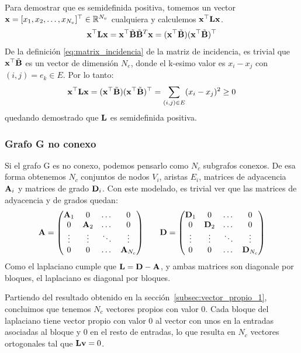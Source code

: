 \documentclass{article}
\begin{document}
Para demostrar que es semidefinida positiva, tomemos un vector $\mathbf{x} = [x_1, x_2, \dots, x_{N_v}]^\top \in \mathbb{R}^{N_v}$
cualquiera y calculemos $\mathbf{x}^\top\mathbf{L}\mathbf{x}$.
\begin{equation*}
    \mathbf{x}^\top\mathbf{L}\mathbf{x} = \mathbf{x}^\top \tilde{\mathbf{B}}\tilde{\mathbf{B}}^T\mathbf{x} = (\mathbf{x}^\top\tilde{\mathbf{B}})(\mathbf{x}^\top\tilde{\mathbf{B}})^\top
\end{equation*}
De la definición \eqref{eq:matrix_incidencia} de la matriz de incidencia, es trivial que $\mathbf{x}^\top \tilde{\mathbf{B}}$ es un vector de dimensión $N_e$, donde el k-esimo valor es $x_i-x_j$ con $(i,j) = e_k \in E$.  Por lo tanto:
\begin{equation}
    \mathbf{x}^\top\mathbf{L}\mathbf{x} = (\mathbf{x}^\top\tilde{\mathbf{B}})(\mathbf{x}^\top\tilde{\mathbf{B}})^\top = \sum_{(i,j)\in E} (x_i-x_j)^2 \geq 0
\end{equation}
quedando demostrado que $\mathbf{L}$ es semidefinida positiva.

\subsubsection{Grafo G no conexo}

Si el grafo G es no conexo, podemos pensarlo como $N_c$ subgrafos conexos. De esa forma
obtenemos $N_c$ conjuntos de nodos $V_i$, aristas $E_i$, matrices de adyacencia $\mathbf{A}_i$ y matrices de grado $\mathbf{D}_i$. Con este modelado, es trivial ver que las matrices de adyacencia y de grados quedan:
\begin{equation*}
    \begin{array}{l c r}
        \mathbf{A} = \left(\begin{matrix}
                             \mathbf{A}_1 & 0      & \dots  & 0          \\
                             0      & \mathbf{A}_2 & \dots  & 0          \\
                             \vdots & \vdots & \ddots & \vdots     \\
                             0      & 0      & \dots  & \mathbf{A}_{N_c}
                         \end{matrix}\right)
         &  &
        \mathbf{D} =\left(\begin{matrix}
                             \mathbf{D}_1 & 0       & \dots  & 0           \\
                             0       & \mathbf{D}_2 & \dots  & 0           \\
                             \vdots  & \vdots  & \ddots & \vdots      \\
                             0       & 0       & \dots  & \mathbf{D}_{N_c}
                         \end{matrix}\right)
    \end{array}
\end{equation*}
Como el laplaciano cumple que $\mathbf{L} = \mathbf{D} - \mathbf{A}$, y ambas matrices son diagonale por bloques, el laplaciano es diagonal por bloques.

Partiendo del resultado obtenido en la sección~\ref{subsec:vector_propio_1}, concluimos que tenemos $N_c$ vectores propios con valor 0. Cada bloque del laplaciano tiene vector propio con valor 0 al vector con unos en la entradas asociadas al bloque y 0 en el resto de entradas, lo que resulta en $N_c$ vectores ortogonales tal que $\mathbf{L} \mathbf{v} = 0$.
\end{document}
